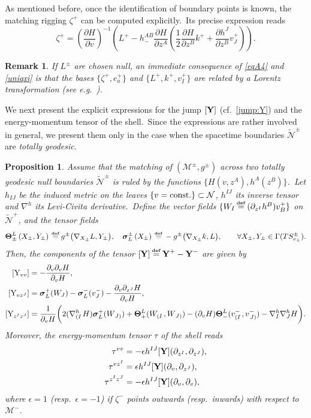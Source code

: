 \documentclass[11pt]{article}
\numberwithin{equation}{section}
\newtheorem{proposition}[theorem]{Proposition}
\newtheorem{remark}[theorem]{Remark}
\def\defi{{\stackrel{\mbox{\tiny {\textbf{def}}}}{\,\, = \,\, }}}
\def\fv{\epsilon}%
\def\bY{\textup{\textbf{Y}}}
\def\Y{\textup{Y}}
\newcommand{\nn}{\nonumber}
\newcommand\N{\mathcal N}
\newcommand\rig{\zeta}
\def\defi{{\stackrel{\mbox{\tiny \textup{\textbf{def}}}}{\,\, = \,\, }}}
\def\nabh{\nabla^h}
\def\bY{\textup{\textbf{Y}}}
\def\Y{\textup{Y}}
\newcommand{\cp}{\partial}
\newcommand{\bs}{\boldsymbol}
\newcommand{\lp}{\left(}
\newcommand{\rp}{\right)}
\newcommand{\Ml}{\mathcal{M^-}}
\newcommand{\ld}{\left.}
\newcommand{\rd}{\right.}
\newcommand{\Mpm}{\mathcal{M}^{\pm}}
\newcommand{\tcr}{\textcolor{red}}
\newcommand{\nullhyp}{\widetilde{\N}}
\begin{document}
As mentioned before, once the identification of boundary points 
is known, the matching rigging $\rig^+$ can be computed explicitly.\ Its precise expression reads \cite[Cor. 1]{manzano2021null} 
\begin{equation}
\label{uniqxi}
\rig^+=\lp\frac{\cp H}{\cp v}\rp^{-1}\lp 
  L^+-  h_-^{AB} \frac{\cp H}{\cp z^A}
     \lp \frac{1}{2} 
   \frac{\cp H}{\cp z^B}     k^++\frac{\cp h^J}{\cp z^B}v^+_J\rp \rp.
\end{equation}
\begin{remark}
If $L^{\pm}$ are chosen null, an immediate consequence of \eqref{eqA4} and \eqref{uniqxi} is that the bases $\{\rig^+,e_a^+\}$ and $\{L^{+},k^{+},v_{I}^{+}\}$ are related by a Lorentz transformation (see e.g.\ \textup{\cite[Ch.\  2]{griffiths2009exact}}).\ 
\end{remark}
We next present the explicit expressions for the jump $[\bY]$ (cf.\ \eqref{jump:Y})
and the energy-momentum tensor of the shell.\ 
Since the expressions are rather involved in general,  
we present them only in the case when the spacetime boundaries $\nullhyp^{\pm}$ are \textit{totally geodesic}.\  
\begin{proposition}
\label{prop6}
\textup{\cite{manzano2021null}}
Assume that the matching of $(\Mpm,g^{\pm})$ across two totally geodesic null boundaries $\nullhyp^{\pm}$ is ruled by  
the functions $\{H(v,z^A),h^A(z^B)\}$.\ 
Let $h_{IJ}$ be the induced metric on the leaves $\{v=\textup{const.}\}\subset\N$,  $h^{IJ}$ its inverse tensor and $\nabh$ its Levi-Civita derivative.\
Define the vector fields $\{W_I\defi (\cp_{z^I} h^B)v_B^+\}$ on $\nullhyp^+$, and
the tensor fields
\begin{equation}
\nn \bs{\Theta}^L_{\pm}\lp X_{\pm}, Y_{\pm}\rp\defi g^{\pm}\big( \nabla_{X_{\pm}}L,{Y_{\pm}}\big), \quad \bs{\sigma}^{\pm}_L\lp X_{\pm}\rp\defi-g^{\pm}\big( \nabla_{X_{\pm}}k,L\big),\qquad\forall X_{\pm},Y_{\pm}\in \Gamma(TS^{\pm}_{v_{\pm}}).
\end{equation}
Then, the components of the tensor $[\bY]\defi \bY^{+}-\bY^-$ are given by
\begin{align}
\nn 
[\Y_{vv}]
&= - \dfrac{\cp_{ v }\cp_{ v }H}{\cp_{ v }H},\\
\label{Y1J} [\Y_{vz^J}]
&= \bs{\sigma}_{L}^+(  W_J)-\bs{\sigma}^-_{L}( v^-_J)-\dfrac{\cp_{ v }\cp_{z^J}H}{\cp_{ v }H},\\
\nn [\Y_{z^Iz^J}]
&=\frac{1}{\cp_{ v }H}\bigg(2(\nabla_{{\lp I\rd}}^hH)\bs{\sigma}_{L}^+( W_{\ld J\rp})+\bs{\Theta}^{L}_+( W_{\lp I\rd},W_{\ld J\rp})-(\cp_{ v } H)\bs{\Theta}^{L}_-( v_{\lp I \rd}^-,v_{\ld J \rp}^-)-\nabla_{I}^h\nabla_{J}^hH\bigg).
\end{align}
Moreover, the energy-momentum tensor $\tau$ of the shell reads 
\begin{align}
\nn \tau^{vv} &=-\fv h^{IJ}[\bY](\cp_{z^I},\cp_{z^J}),\\ 
\tau^{vz^I}&=\fv h^{IJ}[\bY](\cp_{ v },\cp_{z^J}),\\  
\nn \tau^{z^Iz^J}&=-\fv  h^{IJ}[\bY](\cp_{ v },\cp_{ v }),
\end{align}
where $\fv=1$ (resp.\ $\fv=-1$) if $\rig^-$ points outwards (resp.\ inwards) with respect to $\Ml$.
\end{proposition}
\end{document}
